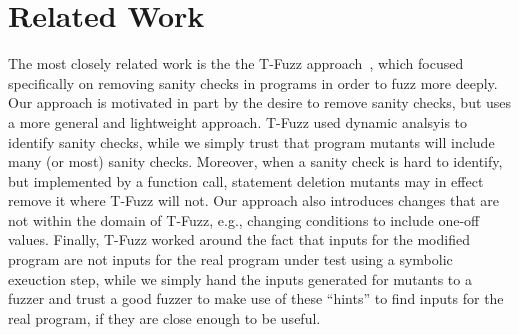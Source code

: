 \section{Related Work}

The most closely related work is the the T-Fuzz approach~\cite{tfuzz}, which focused specifically on removing sanity checks in programs in order to fuzz more deeply.  Our approach is motivated in part by the desire to remove sanity checks, but uses a more general and lightweight approach.  T-Fuzz used dynamic analsyis to identify sanity checks, while we simply trust that program mutants will include many (or most) sanity checks.  Moreover, when a sanity check is hard to identify, but implemented by a function call, statement deletion mutants may in effect remove it where T-Fuzz will not.  Our approach also introduces changes that are not within the domain of T-Fuzz, e.g., changing conditions to include one-off values.  Finally, T-Fuzz worked around the fact that inputs for the modified program are not inputs for the real program under test using a symbolic exeuction step, while we simply hand the inputs generated for mutants to a fuzzer and trust a good fuzzer to make use of these ``hints'' to find inputs for the real program, if they are close enough to be useful.